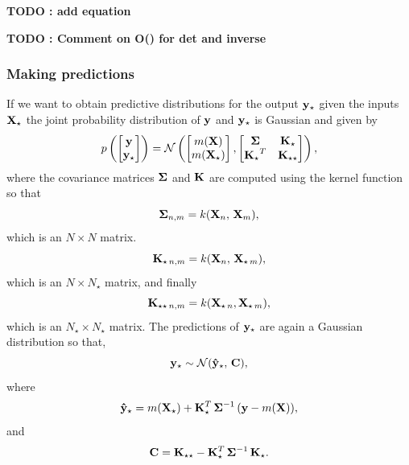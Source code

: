 {\bf TODO : add equation}

{\bf TODO : Comment on O() for det and inverse}

\subsubsection{Making predictions}
If we want to obtain predictive distributions for the output $\bf y_{\star}$ given the inputs $\bf X_{\star}$ the joint probability distribution of $\bf y$ and $\bf y_{\star}$ is Gaussian and given by
\begin{equation}
p \left( \begin{bmatrix} {\bf y} \\ {\bf y_{\star}} \end{bmatrix} \right) = \mathcal{N} \left( \begin{bmatrix} m({\bf X}) \\ m({\bf X_{\star}}) \end{bmatrix} , \begin{bmatrix} {\bf \Sigma} & {\bf K_{\star} }\\ {\bf K_{\star}}^{T} & {\bf K_{\star \star}} \end{bmatrix}  \right), 
\end{equation}
where the covariance matrices $\bf \Sigma$ and $\bf K$ are computed using the kernel function so that
\begin{equation}
{\bf \Sigma}_{n, m} = k({\bf X}_{n}, \, {\bf X}_{m}),
\end{equation}
which is an $N \times N$ matrix.
\begin{equation}
{\bf K}_{\star \, n, m} = k({\bf X}_{n}, \, { \bf X}_{\star \, m}),
\end{equation}
which is an $N \times N_{\star}$ matrix, and finally
\begin{equation}
{\bf K}_{\star \star \, n, m} = k({\bf X}_{\star \, n},  {\bf X}_{\star \,m}),
\end{equation}
which is an $N_{\star} \times N_{\star}$ matrix.
The predictions of $\bf y_{\star}$ are again a Gaussian distribution so that,
\begin{equation}
{\bf y}_{\star} \sim \mathcal{N}(\bf \hat{y}_{\star}, \, \bf C),
\label{eq:pred}
\end{equation}
where 
\begin{equation}
{\bf \hat{y}}_{\star} = m({\bf X}_{\star}) + {\bf K}_{\star}^{T} \, {\bf \Sigma}^{-1} \, ({\bf y} - m(\bf X)),
\end{equation}
and 
\begin{equation}
{\bf C} = {\bf K}_{\star \star} - {\bf K}_{\star}^{T} \, {\bf \Sigma}^{-1} \, {\bf K_{\star}}.
\end{equation}

